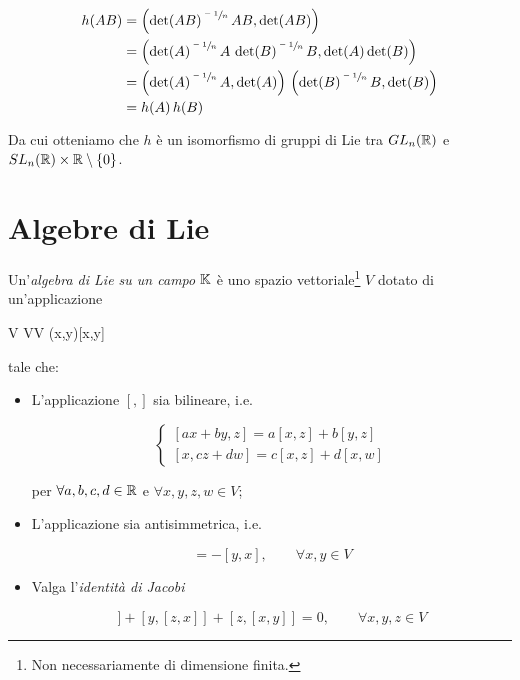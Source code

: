 \begin{align}
	\begin{split}
		h(A B) &= \left( \det(A B)^{\sfrac{-1}{n}} \, A B, \det(A B) \right)\\
		&= \left( \det(A)^{\sfrac{-1}{n}} \, A \, \det(B)^{\sfrac{-1}{n}} \, B, \det(A) \det(B) \right)\\
		&= \left( \det(A)^{\sfrac{-1}{n}} \, A, \det(A) \right) \, \left( \det(B)^{\sfrac{-1}{n}} \, B, \det(B) \right)\\
		&= h(A) \, h(B)
	\end{split}
\end{align}

Da cui otteniamo che $ h $ è un isomorfismo di gruppi di Lie tra $ GL_{n}(\mathbb{R}) $ e $ SL_{n}(\mathbb{R}) \times \mathbb{R} \setminus \{0\} $.

\section{Algebre di Lie}

Un'\textit{algebra di Lie su un campo} $ \mathbb{K} $ è uno spazio vettoriale\footnote{%
	Non necessariamente di dimensione finita.%
} $ V $ dotato di un'applicazione

\map{[,]}%
	{V \times V}{V}%
	{(x,y)}{[x,y]}

tale che:

\begin{itemize}
	\item L'applicazione $ [,] $ sia bilineare, i.e.
	
	\begin{equation}
		\begin{cases}
			[ax+by,z] = a[x,z] + b[y,z]\\
			[x,cz+dw] = c[x,z] + d[x,w]
		\end{cases}
	\end{equation}
	
	per $ \forall a,b,c,d \in \mathbb{R} $ e $ \forall x,y,z,w \in V $;
	
	\item L'applicazione sia antisimmetrica, i.e.
	
	\begin{equation}
		[x,y] = -[y,x], \qquad \forall x,y \in V
	\end{equation}
	
	\item Valga l'\textit{identità di Jacobi}
	
	\begin{equation}
		[x,[y,z]] + [y,[z,x]] + [z,[x,y]] = 0, \qquad \forall x,y,z \in V
	\end{equation}
\end{itemize}

